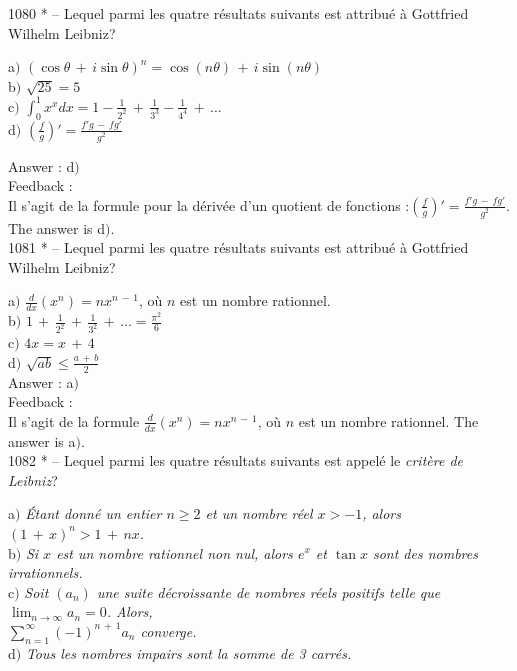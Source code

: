 ﻿\documentclass[letterpaper, 12pt]{article}
\begin{document}
1080 * -- Lequel parmi les quatre r\'esultats suivants est
attribu\'e \`a Gottfried Wilhelm Leibniz?

a$)$
$(\cos\theta\,+\,i\sin\theta)^n=\cos(n\theta)\,+\,i\sin(n\theta)$
\\ [2mm] b$)$ $\sqrt{25}=5$ \\ [3 mm] c$)$
$\int_0^1x^xdx=1-\frac1{2^2}\,+\,\frac1{3^3}-\frac1{4^4}\,+\,\ldots$ \\
[2mm] d$)$ $\left(\frac fg\right)'=\frac{f'g\,-\,fg'}{g^2}$

Answer : d$)$\\

Feedback : \\
Il s'agit de la formule pour la d\'eriv\'ee d'un quotient de
fonctions :$\left(\frac fg\right)'=\frac{f'g\,-\,fg'}{g^2}$.
The answer is d$)$.\\

1081 * -- Lequel parmi les quatre r\'esultats suivants est
attribu\'e \`a Gottfried Wilhelm Leibniz?

a$)$ $\frac d{dx}(x^n)=nx^{n\,-\,1}$, o\`u $n$ est un nombre
rationnel.
\\ [2mm] b$)$ $1\,+\,\frac1{2^2}\,+\,\frac1{3^2}\,+\,\ldots=\frac{\pi^2}6$
\\ [3 mm] c$)$ $4x=x\,+\,4$ \\ [2mm]
d$)$ $\sqrt{ab}\le\frac{a\,+\,b}2$\\

Answer : a$)$\\

Feedback : \\
Il s'agit de la formule $\frac d{dx}(x^n)=nx^{n\,-\,1}$, o\`u $n$
est un nombre rationnel.
The answer is a$)$.\\

1082 * -- Lequel parmi les quatre r\'esultats suivants est appel\'e
le {\sl crit\`ere de Leibniz}?

a$)$ {\sl \'Etant donn\'e un entier $n\ge2$ et un nombre r\'eel $x>-1$,
alors $(1\,+\,x)^n>1\,+\,nx$.} \\[2mm]
b$)$ {\sl Si $x$ est un nombre rationnel non nul, alors $e^x$ et $\tan x$
sont des nombres irrationnels.} \\[2mm]
c$)$ {\sl Soit $(a_n)$ une suite d\'ecroissante de nombres r\'eels positifs
telle que $\lim_{n\to\infty}a_n=0$.  Alors, \\[2mm]
$\sum_{n=1}^{\infty}(-1)^{n\,+\,1}a_n$ converge.} \\[2mm]
d$)$ {\sl Tous les nombres impairs sont la somme de 3 carr\'es.}
\end{document}
